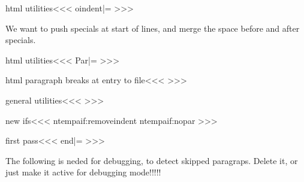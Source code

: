 \<html utilities\><<<
\let\:noindent|=\noindent
\def\noindent{\ifx \EndPicture\:UnDef
     \ifvmode  \IgnoreIndent\leavevmode\fi
   \else \:noindent \fi}
>>>


We want to push specials at start of lines, and merge the space before
and after specials.

\<html utilities\><<<
\let\skip:Par|=\empty
>>>




\<html paragraph breaks at entry to file\><<<
\def\HtmlPar{\HtmlPar:Off{%
   \if:nopar \ShowPar \ShowIndent
      \ifx \skip:Par\empty\else \hskip -\parindent \skip:Par\fi
   \else 
     \if:removeindent \ShowIndent \hskip -\parindent \a:Par
     \else 
        \ifdim \parindent>\z@ \hskip -\parindent \fi 
        \html:par
        \ifdim \parindent>\z@ \hskip  \parindent \fi
   \fi\fi \relax
}}%
>>>


\<general utilities\><<<
\def\IgnorePar{\ifx \EndPicture\:UnDef \Protect\gl:nopartrue \fi}
\def\ShowPar{\ifx \EndPicture\:UnDef \Protect\gl:noparfalse \fi}
\def\IgnoreIndent{\ifx \EndPicture\:UnDef 
   \Protect\gl:removeindenttrue \fi}
\def\ShowIndent{\ifx \EndPicture\:UnDef 
   \Protect\gl:removeindentfalse \fi}
\def\gl:nopartrue{\global\:nopartrue}
\def\gl:noparfalse{\global\:noparfalse}
\def\gl:removeindenttrue{\global\:removeindenttrue}
\def\gl:removeindentfalse{\global\:removeindentfalse}
\def\HtmlParOff{\global\let\HtmlPar:Off|=\:gobble}
\def\HtmlParOn{\gdef\HtmlPar:Off##1{##1}}
\HtmlParOn
>>>





\<new ifs\><<<
\:tempa{if:removeindent}
\:tempa{if:nopar}
>>>




\<first pass\><<<
\def\c:HtmlPar:#1#2#3#4{%
   \def\:temp{#3}\ifx \:temp\empty \c:def\a:Par{#1}\else
     \c:def\a:Par{#1\Next:EndP{#3}}\fi
   \def\:temp{#4}\ifx \:temp\empty \c:def\html:par{#2}\else
     \c:def\html:par{#2\Next:EndP{#4}}\fi
}
\def\EndP{\Protect\par:end}
\let\par:end|=\empty
\def\Next:EndP{\Protect\next:endp}
\def\next:endp#1{\gdef\par:end{#1\global\let\par:end|=\empty}}
\def\SaveHtmlPar{\PushMacro\a:Par \PushMacro\html:par}
\def\RecallHtmlPar{\PopMacro\a:Par \PopMacro\html:par}
>>>


The following is neded for debugging, to detect skipped paragraps.
Delete it, or just make it active for debugging mode!!!!!


